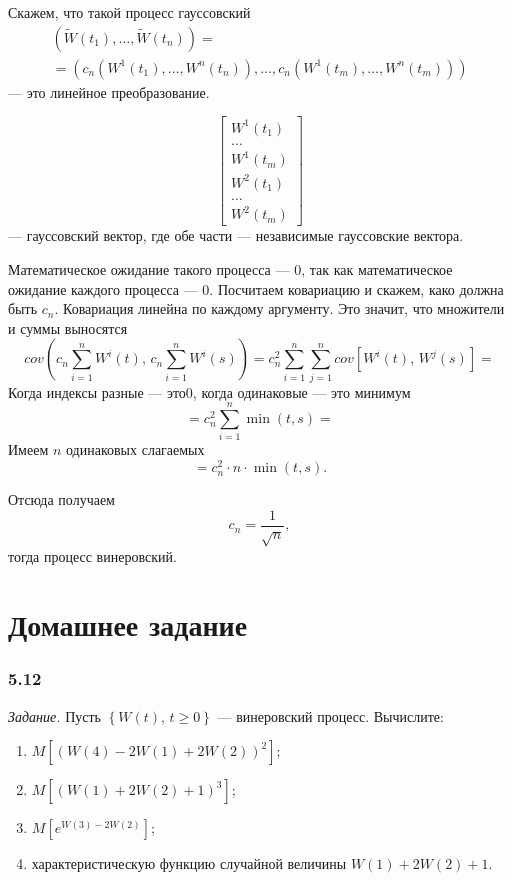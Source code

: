 Скажем, что такой процесс гауссовский
\begin{gather*}
  \left( \tilde{W} \left( t_1 \right), \dotsc, \tilde{W} \left( t_n \right) \right) = \\
  = \left(
    c_n \left( W^1 \left( t_1 \right), \dotsc, W^n \left( t_n \right) \right), \dotsc,
    c_n \left( W^1 \left( t_m \right), \dotsc, W^n \left( t_m \right) \right)
  \right)
\end{gather*}
--- это линейное преобразование.

$$ \begin{bmatrix}
    W^1 \left( t_1 \right) \\
    \dotsc \\
    W^1 \left( t_m \right) \\
    W^2 \left( t_1 \right) \\
    \dotsc \\
    W^2 \left( t_m \right)
  \end{bmatrix}$$
--- гауссовский вектор, где обе части --- независимые гауссовские вектора.

Математическое ожидание такого процесса --- 0, так как математическое ожидание каждого процесса ---
0.
Посчитаем ковариацию и скажем, како должна быть $c_n.$
Ковариация линейна по каждому аргументу.
Это значит, что множители и суммы выносятся
$$cov \left(
    c_n \sum \limits_{i = 1}^n W^i \left( t \right), \,
    c_n \sum \limits_{i = 1}^n W^i \left( s \right)
  \right) =
  c_n^2 \sum \limits_{i = 1}^n
    \sum \limits_{j = 1}^n cov \left[ W^i \left( t \right), \, W^j \left( s \right) \right] =$$
Когда индексы разные --- это0, когда одинаковые --- это минимум
$$= c_n^2 \sum \limits_{i = 1}^n \min \left( t, s \right) =$$
Имеем $n$ одинаковых слагаемых
$$= c_n^2 \cdot n \cdot \min \left( t, s \right).$$

Отсюда получаем
$$c_n =
  \frac{1}{ \sqrt{n}},$$
тогда процесс винеровский.

\section*{Домашнее задание}

\subsubsection*{5.12}

\textit{Задание.}
Пусть $ \left\{ W \left( t \right), \, t \geq 0 \right\} $ --- винеровский процесс.
Вычислите:
\begin{enumerate}[label=\alph*)]
  \item $M \left[
      \left( W \left( 4 \right) - 2W \left( 1 \right) + 2W \left( 2 \right) \right)^2 \right] $;
  \item $M \left[ \left( W \left( 1 \right) + 2W \left( 2 \right) + 1 \right)^3 \right] $;
  \item $M \left[ e^{W \left( 3 \right) - 2W \left( 2 \right) } \right] $;
  \item характеристическую функцию случайной величины $W \left( 1 \right) + 2W \left( 2 \right) + 1$.
\end{enumerate}

